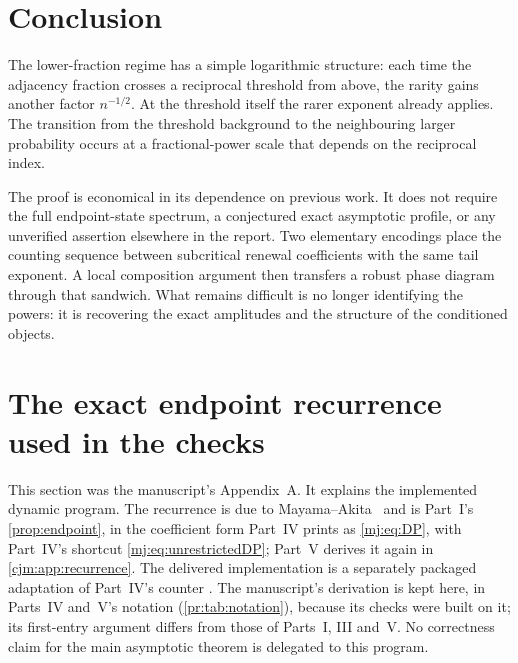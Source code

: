 \documentclass[11pt,a4paper]{article}
\theoremstyle{definition}\newaliascnt{definition}{theorem}
\theoremstyle{remark}\newaliascnt{remark}{theorem}
\begin{document}
\section{Conclusion}
\label{pr:sec:conclusion}
The lower-fraction regime has a simple logarithmic structure: each time the
adjacency fraction crosses a reciprocal threshold from above, the rarity
gains another factor $n^{-1/2}$. At the threshold itself the rarer exponent
already applies. The transition from the threshold background to the
neighbouring larger probability occurs at a fractional-power scale that
depends on the reciprocal index.

The proof is economical in its dependence on previous work. It does not
require the full endpoint-state spectrum, a conjectured exact asymptotic
profile, or any unverified assertion elsewhere in the report. Two elementary
encodings place the counting sequence between subcritical renewal
coefficients with the same tail exponent. A local composition argument then
transfers a robust phase diagram through that sandwich. What remains
difficult is no longer identifying the powers: it is recovering the exact
amplitudes and the structure of the conditioned objects.

\section{The exact endpoint recurrence used in the checks}
\label{pr:app:dp}
This section was the manuscript's Appendix~A. It explains the implemented
dynamic program. The recurrence is due to Mayama--Akita~\cite{MayamaAkita}
and is Part~I's \cref{prop:endpoint}, in the coefficient form Part~IV prints
as \eqref{mj:eq:DP}, with Part~IV's shortcut \eqref{mj:eq:unrestrictedDP};
Part~V derives it again in \cref{cjm:app:recurrence}. The delivered
implementation is a separately packaged adaptation of Part~IV's counter
. The manuscript's derivation is
kept here, in Parts~IV and~V's notation (\cref{pr:tab:notation}), because its
checks were built on it; its first-entry argument differs from those of
Parts~I, III and~V. No correctness claim for the main asymptotic theorem is
delegated to this program.
\end{document}
